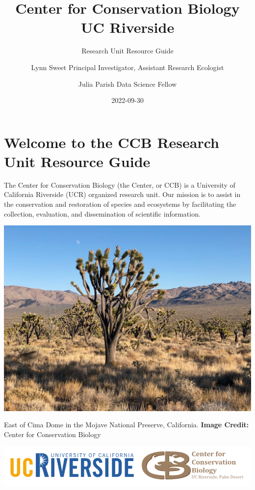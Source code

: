 \documentclass[
]{book}
\title{Center for Conservation Biology \textbar{} UC Riverside}
\subtitle{Research Unit Resource Guide}
\author{Lynn Sweet \textbar{} Principal Investigator, Assistant Research Ecologist \and Julia Parish \textbar{} Data Science Fellow}
\date{2022-09-30}
\begin{document}
\maketitle

{
\setcounter{tocdepth}{1}
\tableofcontents
}
\hypertarget{welcome-to-the-ccb-research-unit-resource-guide}{%
\chapter*{Welcome to the CCB Research Unit Resource Guide}\label{welcome-to-the-ccb-research-unit-resource-guide}}

The Center for Conservation Biology (the Center, or CCB) is a University of California Riverside (UCR) organized research unit. Our mission is to assist in the conservation and restoration of species and ecosystems by facilitating the collection, evaluation, and dissemination of scientific information.

\includegraphics[width=1\linewidth]{images/cima2019}

East of Cima Dome in the Mojave National Preserve, California.
\textbf{Image Credit:} Center for Conservation Biology

\begin{center}\includegraphics[width=0.75\linewidth]{images/ucrccb} \end{center}
\end{document}
